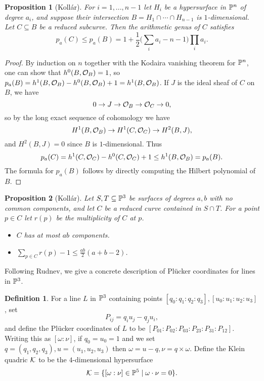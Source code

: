 \documentclass[letterpaper,11pt]{article}
\newtheorem{prop}{Proposition}
\theoremstyle{definition}
\newtheorem{defn}{Definition}
\theoremstyle{remark}
\begin{document}
\begin{prop}[Koll\'ar] For $i = 1, ..., n-1$ let $H_i$ be a hypersurface in $\mathbb{P}^n$ of degree $a_i$, and suppose their intersection $B = H_1 \cap \cdots \cap H_{n-1}$ is $1$-dimensional. Let $C\subseteq B$ be a reduced subcurve. Then the arithmetic genus of $C$ satisfies
\[
p_a(C) \le p_a(B) = 1 + \frac{1}{2}\bigg(\sum_i a_i - n - 1\bigg)\prod_i a_i.
\]
\end{prop}
\begin{proof} By induction on $n$ together with the Kodaira vanishing theorem for $\mathbb{P}^n$, one can show that $h^0(B,\mathcal{O}_B) = 1$, so $p_a(B) = h^1(B,\mathcal{O}_B)-h^0(B,\mathcal{O}_B)+1 = h^1(B,\mathcal{O}_B)$. If $J$ is the ideal sheaf of $C$ on $B$, we have
\[
0\rightarrow J \rightarrow \mathcal{O}_B \rightarrow \mathcal{O}_C \rightarrow 0,
\]
so by the long exact sequence of cohomology we have
\[
H^1(B,\mathcal{O}_B) \rightarrow H^1(C,\mathcal{O}_C) \rightarrow H^2(B,J),
\]
and $H^2(B,J) = 0$ since $B$ is $1$-dimensional. Thus
\[
p_a(C) = h^1(C,\mathcal{O}_C) - h^0(C,\mathcal{O}_C) + 1 \le h^1(B,\mathcal{O}_B) = p_a(B).
\]
The formula for $p_a(B)$ follows by directly computing the Hilbert polynomial of $B$.
\end{proof}

\begin{prop}[Koll\'ar]\label{intersect} Let $S,T\subseteq \mathbb{P}^3$ be surfaces of degrees $a,b$ with no common components, and let $C$ be a reduced curve contained in $S\cap T$. For a point $p\in C$ let $r(p)$ be the multiplicity of $C$ at $p$.
\begin{itemize}
\item[1)] $C$ has at most $ab$ components.
\item[2)] $\sum_{p\in C} r(p)-1 \le \frac{ab}{2}(a+b-2)$.
\end{itemize}
\end{prop}

Following Rudnev, we give a concrete description of Pl\"ucker coordinates for lines in $\mathbb{P}^3$.

\begin{defn} For a line $L$ in $\mathbb{P}^3$ containing points $[q_0:q_1:q_2:q_3], [u_0:u_1:u_2:u_3]$, set
\[
P_{ij} = q_iu_j-q_ju_i,
\]
and define the Pl\"ucker coordinates of $L$ to be $[P_{01}:P_{02}:P_{03}:P_{23}:P_{31}:P_{12}]$. Writing this as $[\omega:\nu]$, if $q_0 = u_0 = 1$ and we set $q = (q_1,q_2,q_3), u = (u_1,u_2,u_3)$ then $\omega = u-q, \nu = q\times\omega$. Define the Klein quadric $\mathcal{K}$ to be the $4$-dimensional hypersurface
\[
\mathcal{K} = \{[\omega:\nu]\in \mathbb{P}^5\mid \omega\cdot\nu = 0\}.
\]
\end{defn}
\end{document}
